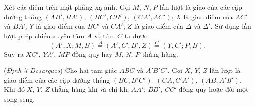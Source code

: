         \begin{solution}
            Xét các điểm trên mặt phẳng xạ ảnh. Gọi \(M\), \(N\), \(P\) lần lượt là giao của các cặp đường thẳng \((AB',BA')\), \((BC',CB')\), \((CA',AC')\); \(X\) là giao điểm của \(AC'\) và \(BA'\); \(Y\) là giao điểm của \(BC'\) và \(CA'\); \(Z\) là giao điểm của \(\Delta\) và \(\Delta'\). Sử dụng lần lượt phép chiếu xuyên tâm \(A\) và tâm \(C\) ta được
            \[(A',X;M,B) \stackrel{A}{=} (A',C';B',Z) \stackrel{C}{=} (Y,C';P,B).\]
            Suy ra \(XC'\), \(YA'\), \(MP\) đồng quy hay \(M\), \(N\), \(P\) thẳng hàng.
        \end{solution}

        \begin{theorem}
            (\textit{Định lí Desargues}) Cho hai tam giác \(ABC\) và \(A'B'C'\). Gọi \(X\), \(Y\), \(Z\) lần lượt là giao điểm của các cặp đường thẳng \((BC, B'C')\), \((CA, C'A')\), \((AB, A'B')\). Khi đó \(X\), \(Y\), \(Z\) thẳng hàng khi và chỉ khi \(AA'\), \(BB'\), \(CC'\) đồng quy hoặc đôi một song song.
        \end{theorem}

